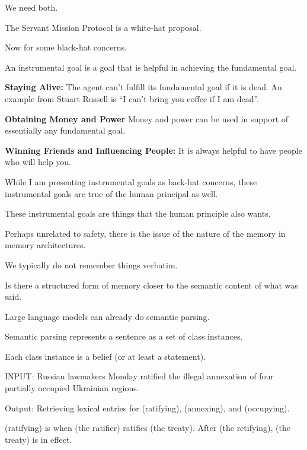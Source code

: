 {\vfill
We need both.

\vfill
The Servant Mission Protocol is a white-hat proposal.

\vfill
Now for some black-hat concerns.


An instrumental goal is a goal that is helpful in achieving the fundamental goal.

\vfill
{\bf Staying Alive:} The agent can't fulfill its fundamental goal if it is dead.  An example from Stuart Russell is ``I can't bring you coffee if I am dead''.

\vfill
{\bf Obtaining Money and Power} Money and power can be used in support of essentially any fundamental goal.

\vfill
{\bf Winning Friends and Influencing People:}  It is always helpful to have people who will help you.


While I am presenting instrumental goals as back-hat concerns, these instrumental goals are true of the human principal as well.

\vfill
These instrumental goals are things that the human principle also wants.


Perhaps unrelated to safety, there is the issue of the nature of the memory
in memory architectures.

\vfill
We typically do not remember things verbatim.

\vfill
Is there a structured form of memory closer to the semantic content of what was said.


Large language models can already do semantic parsing.

\vfill
Semantic parsing represents a sentence as a set of class instances.

\vfill
Each class instance is a belief (or at least a statement).



INPUT: Russian lawmakers Monday ratified the illegal annexation of four partially occupied Ukrainian regions.

\vfill
Output: Retrieving lexical entries for (ratifying), (annexing), and (occupying).

\vfill
(ratifying) is when (the ratifier) ratifies (the treaty).
After (the retifying), (the treaty) is in effect.

}

